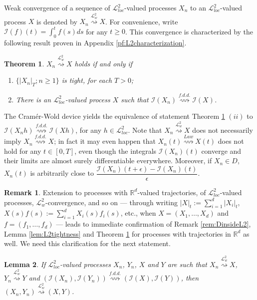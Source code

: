 \documentclass[final]{amsart}
\newtheorem{thm}{Theorem}[section]
\newtheorem{lem}[thm]{Lemma}
\theoremstyle{definition}
\newtheorem{rem}{Remark}[section]
\numberwithin{equation}{section}
\newcommand{\dR}{\ensuremath{\mathbb{R}}}
\newcommand{\cI}{\ensuremath{\mathcal{I}}}
\newcommand{\cL}{\ensuremath{\mathcal{L}}}
\begin{document}
Weak convergence of a sequence of $\cL^2_{loc}$-valued processes $X_n$ to an $\cL^2_{loc}$-valued process $X$
is denoted by $X_n\stackrel{\cL^2_w}{\rightsquigarrow} X$. For convenience, write $\cI(f)(t) = \int_0^t f(s)ds $ for any $t\ge 0$.
This convergence is characterized by the following result proven in Appendix \ref{pf:L2characterization}.

\begin{thm}\label{thm:L2characterization}
$X_n\stackrel{\cL^2_w}{\rightsquigarrow} X$ holds if and only if
\begin{enumerate}
\item[(i)]
$\bigl\{|X_n|_T; n\ge1\bigr\}$ is tight, for each $T>0$;

\item[(ii)]
There is an $\cL^2_{loc}$-valued process $X$ such that $\cI(X_n)  \stackrel{f.d.d.}{\rightsquigarrow} \cI(X)$.

\end{enumerate}
\end{thm}

The Cram{\'e}r-Wold device yields the equivalence of statement Theorem \ref{thm:L2characterization} $(ii)$ to
$\cI(X_n h)  \stackrel{f.d.d.}{\rightsquigarrow} \cI(X h)$, for any $h\in\cL^2_{loc}$.
Note that $X_n\stackrel{\cL^2_w}{\rightsquigarrow} X$ does not necessarily imply $X_n \stackrel{f.d.d.}{\rightsquigarrow} X$;
in fact it may even happen that $X_n(t) \stackrel{Law}{\rightsquigarrow} X(t)$ does not hold for any $t\in[0,T]$, even though
the integrals $\cI(X_n)(t)$ converge and their limits are almost surely differentiable everywhere.
Moreover, if $X_n\in D$, $X_n(t)$ is arbitrarily close to $\dfrac{\cI(X_n)(t+\epsilon)-\cI(X_n)(t)}{\epsilon}$.

\begin{rem}\label{rem:RdExtension1}
Extension to processes with $\dR^d$-valued trajectories, of $\cL^2_{loc}$-valued processes, $\cL^2_w$-convergence, and so on ---
through writing $|X|_t:=\sum_{i=1}^d|X_i|_t$, $X(s)f(s):=\sum_{i=1}^d X_i(s)f_i(s)$, etc.,
when $X=(X_1,\ldots,X_d)$ and $f=(f_1,\ldots,f_d)$ --- leads to immediate confirmation of
Remark \ref{rem:DinsideL2}, Lemma \ref{lem:L2tightness} and Theorem \ref{thm:L2characterization}
for processes with trajectories in $\dR^d$ as well. We need this clarification for the next statement.
\end{rem}

\begin{lem}\label{lem:lem_pairs}
If $\cL^2_{loc}$-valued processes $X_n$, $Y_n$, $X$ and $Y$ are such that
$X_n\stackrel{\cL^2_w}{\rightsquigarrow}X$, $Y_n \stackrel{\cL^2_w}{\rightsquigarrow}Y$ and
$\left( \cI(X_n) , \cI( Y_n) \right ) \stackrel{f.d.d.}{\rightsquigarrow}
\left( \cI(X)  , \cI(Y) \right )$,
then $(X_n,Y_n) \stackrel{\cL^2_w}{\rightsquigarrow} (X,Y)$.
\end{lem}
\end{document}
